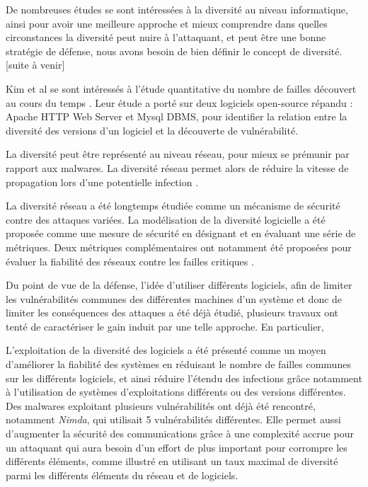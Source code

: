 De nombreuses études se sont intéressées à la diversité au niveau informatique, ainsi pour avoir une meilleure approche et mieux comprendre dans quelles circonstances la diversité peut nuire à l’attaquant, et peut être une bonne stratégie de défense, nous avons besoin de bien définir le concept de diversité. 
[suite à venir]

Kim et al se sont intéressés à l’étude quantitative du nombre de failles découvert au cours du temps \cite{vulnerabilityDiscovery}. Leur étude a porté sur deux logiciels open-source répandu : Apache HTTP Web Server et Mysql DBMS, pour identifier la relation entre la diversité des versions d’un logiciel et la découverte de vulnérabilité.

La diversité peut être représenté au niveau réseau, pour mieux se prémunir par rapport aux malwares. La diversité réseau permet alors de réduire la vitesse de propagation lors d’une potentielle infection \cite{OptimisingNetwork}. 

La diversité réseau a été longtemps étudiée comme un mécanisme de sécurité contre des attaques variées. La modélisation de la diversité logicielle a été proposée comme une mesure de sécurité en désignant et en évaluant une série de métriques. Deux métriques complémentaires ont notamment été proposées pour évaluer la fiabilité des réseaux contre les failles critiques \cite{networkDiversity}.

Du point de vue de la défense, l'idée d'utiliser différents logiciels, afin de limiter les vulnérabilités communes des différentes machines d’un système et donc de limiter les conséquences des attaques a été déjà étudié, plusieurs
travaux ont tenté de caractériser le gain induit par une telle approche. En particulier, \cite{softwareDiversity:Security}

L'exploitation de la diversité des logiciels a été présenté comme un moyen d'améliorer la fiabilité des systèmes en réduisant le nombre de failles communes sur les différents logiciels, et ainsi réduire l’étendu des infections grâce notamment à l’utilisation de systèmes d'exploitations différents ou des versions différentes.\cite{softwareDiversityPracticalStatistics}
Des malwares exploitant plusieurs vulnérabilités ont déjà été rencontré, notamment \textit{Nimda}, qui utilisait 5 vulnérabilités différentes. 
Elle permet aussi d'augmenter la sécurité des communications grâce à une complexité accrue pour un attaquant qui aura besoin d’un effort de plus important pour corrompre les différents éléments, comme illustré en utilisant un taux maximal de diversité parmi les différents éléments du réseau et de logiciels\cite{maximalRatio}. 

